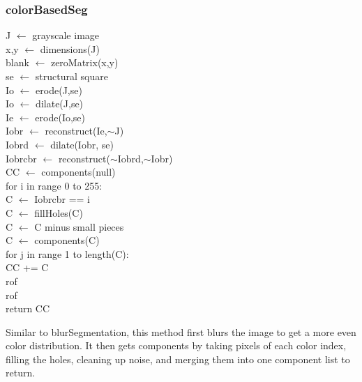 \documentclass[12pt]{article}
\newcommand\tab[1][1cm]{\hspace*{#1}}
\begin{document}
\subsubsection*{colorBasedSeg}
\begin{addmargin}[12em]{1em}
	J $\leftarrow$ grayscale image \\
	x,y $\leftarrow$ dimensions(J) \\
	blank $\leftarrow$ zeroMatrix(x,y) \\
	se $\leftarrow$ structural square \\
	Io $\leftarrow$ erode(J,se) \\
	Io $\leftarrow$ dilate(J,se) \\
	Ie $\leftarrow$ erode(Io,se) \\
	Iobr $\leftarrow$ reconstruct(Ie,$\sim$J) \\
	Iobrd $\leftarrow$ dilate(Iobr, se) \\
	Iobrcbr $\leftarrow$ reconstruct($\sim$Iobrd,$\sim$Iobr) \\
	CC $\leftarrow$ components(null) \\
	for i in range 0 to 255: \\
	\tab C $\leftarrow$ Iobrcbr == i \\
	\tab C $\leftarrow$ fillHoles(C) \\
	\tab C $\leftarrow$ C minus small pieces \\
	\tab C $\leftarrow$ components(C) \\
	\tab for j in range 1 to length(C): \\
	\tab\tab CC += C \\
	\tab rof \\
	rof \\
	return CC \\	
\end{addmargin}
Similar to blurSegmentation, this method first blurs the image to get a more even color distribution. It then gets components by taking pixels of each color index, filling the holes, cleaning up noise, and merging them into one component list to return.
\end{document}
